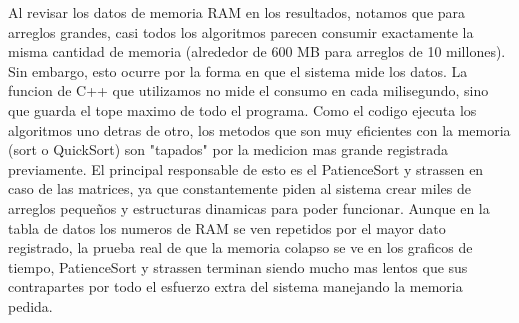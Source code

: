 Al revisar los datos de memoria RAM en los resultados, notamos que para arreglos grandes, casi todos los algoritmos parecen consumir exactamente la misma cantidad de memoria (alrededor de 600 MB para arreglos de 10 millones). Sin embargo, esto ocurre por la forma en que el sistema mide los datos. La funcion de C++ que utilizamos no mide el consumo en cada milisegundo, sino que guarda el tope maximo de todo el programa. Como el codigo ejecuta los algoritmos uno detras de otro, los metodos que son muy eficientes con la memoria (sort o QuickSort) son "tapados" por la medicion mas grande registrada previamente. El principal responsable de esto es el PatienceSort y strassen en caso de las matrices, ya que constantemente piden al sistema crear miles de arreglos pequeños y estructuras dinamicas para poder funcionar. Aunque en la tabla de datos los numeros de RAM se ven repetidos por el mayor dato registrado, la prueba real de que la memoria colapso se ve en los graficos de tiempo, PatienceSort y strassen terminan siendo mucho mas lentos que sus contrapartes por todo el esfuerzo extra del sistema manejando la memoria pedida.
